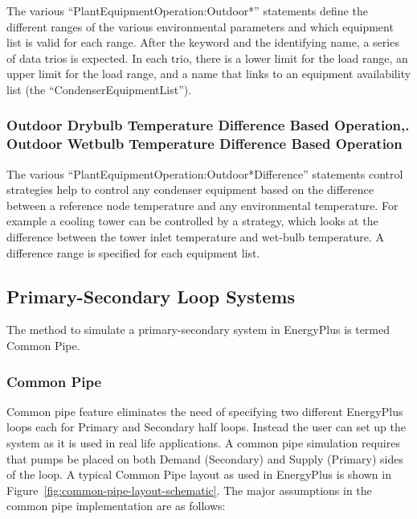 The various ``PlantEquipmentOperation:Outdoor*'' statements define the different ranges of the various environmental parameters and which equipment list is valid for each range. After the keyword and the identifying name, a series of data trios is expected. In each trio, there is a lower limit for the load range, an upper limit for the load range, and a name that links to an equipment availability list (the ``CondenserEquipmentList'').

\subsubsection{Outdoor Drybulb Temperature Difference Based Operation,. Outdoor Wetbulb Temperature Difference Based Operation}\label{outdoor-drybulb-temperature-difference-based-operation.-outdoor-wetbulb-temperature-difference-based-operation}

The various ``PlantEquipmentOperation:Outdoor*Difference'' statements control strategies help to control any condenser equipment based on the difference between a reference node temperature and any environmental temperature. For example a cooling tower can be controlled by a strategy, which looks at the difference between the tower inlet temperature and wet-bulb temperature. A difference range is specified for each equipment list.

\subsection{Primary-Secondary Loop Systems}\label{primary-secondary-loop-systems}

The method to simulate a primary-secondary system in EnergyPlus is termed Common Pipe.

\subsubsection{Common Pipe}\label{common-pipe}

Common pipe feature eliminates the need of specifying two different EnergyPlus loops each for Primary and Secondary half loops. Instead the user can set up the system as it is used in real life applications. A common pipe simulation requires that pumps be placed on both Demand (Secondary) and Supply (Primary) sides of the loop. A typical Common Pipe layout as used in EnergyPlus is shown in Figure~\ref{fig:common-pipe-layout-schematic}. The major assumptions in the common pipe implementation are as follows:

